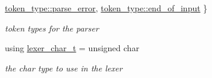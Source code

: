 \begin{DoxyCompactItemize}
\hyperlink{classnlohmann_1_1basic__json_1_1lexer_a96887d6cd131e3d3a85a9d71fbdbcdf7a456e19aeafa334241c7ff3f589547f9d}{token\+\_\+type\+::parse\+\_\+error}, 
\hyperlink{classnlohmann_1_1basic__json_1_1lexer_a96887d6cd131e3d3a85a9d71fbdbcdf7aca11f56dd477c09e06583dbdcda0985f}{token\+\_\+type\+::end\+\_\+of\+\_\+input}
 \}\begin{DoxyCompactList}\small\item\em token types for the parser \end{DoxyCompactList}
\item 
using \hyperlink{classnlohmann_1_1basic__json_1_1lexer_abe04be04d0575249f8806c334bacbc80}{lexer\+\_\+char\+\_\+t} = unsigned char
\begin{DoxyCompactList}\small\item\em the char type to use in the lexer \end{DoxyCompactList}\end{DoxyCompactItemize}
